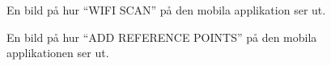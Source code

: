 \documentclass[a4paper,12pt]{article}
\begin{document}
 \begin{figure}[H]
   \centering
   \caption{En bild på hur ``WIFI SCAN'' på den mobila applikation ser ut.}
   \label{fig:mob_scan_cal}
 \end{figure}

 \begin{figure}[H]
   \centering
   \caption{En bild på hur ``ADD REFERENCE POINTS'' på den mobila applikationen ser ut.}
   \label{fig:mob_scan_ref}
 \end{figure}
\end{document}
